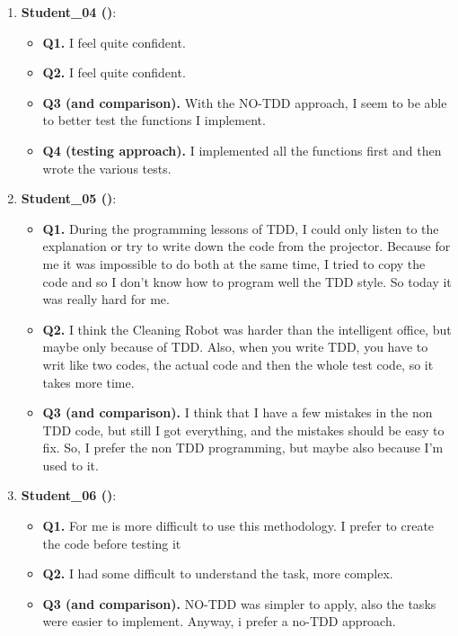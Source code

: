 \begin{enumerate}
    \item \textbf{Student\_04 (\notdd)}:
    \begin{itemize}
        \item \textbf{Q1.} I feel quite confident.
        \item \textbf{Q2.} I feel quite confident.
        \item \textbf{Q3 (\tdd and \notdd comparison).} With the NO-TDD approach, I seem to be able to better test the functions I implement. 
        \item \textbf{Q4 (\notdd testing approach).} I implemented all the functions first and then wrote the various tests. 
    \end{itemize}

    \item \textbf{Student\_05 (\notdd)}:
    \begin{itemize}
        \item \textbf{Q1.} During the programming lessons of TDD, I could only listen to the explanation or try to write down the code from the projector. Because for me it was impossible to do both at the same time, I tried to copy the code and so I don't know how to program well the TDD style. So today it was really hard for me.
        \item \textbf{Q2.} I think the Cleaning Robot was harder than the intelligent office, but maybe only because of TDD. Also, when you write TDD, you have to writ like two codes, the actual code and then the whole test code, so it takes more time.
        \item \textbf{Q3 (\tdd and \notdd comparison).} I think that I have a few mistakes in the non TDD code, but still I got everything, and the mistakes should be easy to fix. So, I prefer the non TDD programming, but maybe also because I'm used to it.
    \end{itemize}

    \item \textbf{Student\_06 (\tdd)}:
    \begin{itemize}
        \item \textbf{Q1.} For me is more difficult to use this methodology. I prefer to create the code before testing it   
        \item \textbf{Q2.} I had some difficult to understand the task, more complex. 
        \item \textbf{Q3 (\tdd and \notdd comparison).} NO-TDD was simpler to apply, also the tasks were easier to implement. Anyway, i prefer a no-TDD approach.
    \end{itemize}


\end{enumerate}
